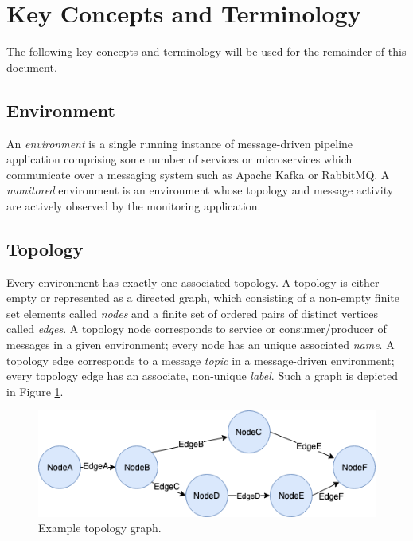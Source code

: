 \section{Key Concepts and Terminology}

The following key concepts and terminology will be used for the remainder of this document.

\subsection{Environment}

An \textit{environment} is a single running instance of message-driven pipeline application comprising some number of services or microservices which communicate over a messaging system such as Apache Kafka or RabbitMQ. A \textit{monitored} environment is an environment whose topology and message activity are actively observed by the monitoring application.

\subsection{Topology}

Every environment has exactly one associated topology. A topology is either empty or represented as a directed graph, which consisting of a non-empty finite set elements called \textit{nodes} and a finite set of ordered pairs of distinct vertices called \textit{edges}\cite{GraphTheory}. A topology node corresponds to service or consumer/producer of messages in a given environment; every node has an unique associated \textit{name}. A topology edge corresponds to a message \textit{topic} in a message-driven environment; every topology edge has an associate, non-unique \textit{label}. Such a graph is depicted in Figure \ref{topology_graph}.

\begin{figure}[H]
	\centering  
	\includegraphics[scale=0.8]{figures/design/topology_graph.png}
	\caption{Example topology graph.}
	\label{topology_graph}
\end{figure}

